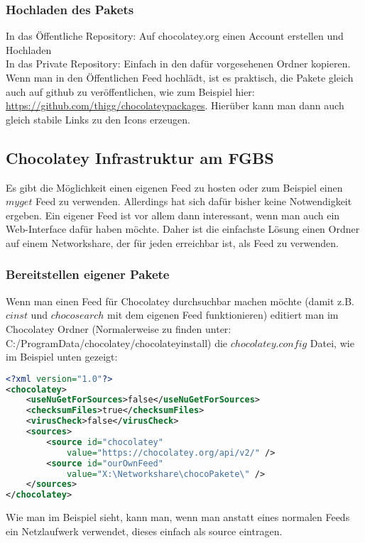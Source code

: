 \documentclass[10pt,a4paper]{article}
\begin{document}
\subsubsection{Hochladen des Pakets}
In das Öffentliche Repository: Auf chocolatey.org einen Account erstellen und Hochladen\\
In das Private Repository: Einfach in den dafür vorgesehenen Ordner kopieren.\\
Wenn man in den Öffentlichen Feed hochlädt, ist es praktisch, die Pakete gleich auch auf github zu veröffentlichen, wie zum Beispiel hier: \url{https://github.com/thigg/chocolateypackages}. Hierüber kann man dann auch gleich stabile Links zu den Icons erzeugen.



\subsection{Chocolatey Infrastruktur am FGBS}
Es gibt die Möglichkeit einen eigenen Feed zu hosten oder zum Beispiel einen $myget$ Feed zu verwenden. Allerdings
hat sich dafür bisher keine Notwendigkeit ergeben. Ein eigener Feed ist vor allem dann interessant, wenn man auch ein Web-Interface dafür haben möchte. Daher ist die einfachste Lösung einen Ordner auf einem Networkshare, der für jeden erreichbar ist, als Feed zu verwenden.

\subsubsection{Bereitstellen eigener Pakete}
Wenn man einen Feed für Chocolatey durchsuchbar machen möchte
(damit z.B. $cinst$ und $choco search$ mit dem eigenen Feed funktionieren)
 editiert man im Chocolatey Ordner 
 (Normalerweise zu finden unter: C:/ProgramData/chocolatey/chocolateyinstall) die $chocolatey.config$ Datei, wie im Beispiel unten gezeigt:
\begin{lstlisting}[language=XML]
<?xml version="1.0"?>
<chocolatey>
    <useNuGetForSources>false</useNuGetForSources>
    <checksumFiles>true</checksumFiles>
    <virusCheck>false</virusCheck>
    <sources>
        <source id="chocolatey" 
            value="https://chocolatey.org/api/v2/" />
        <source id="ourOwnFeed" 
            value="X:\Networkshare\chocoPakete\" />
    </sources>
</chocolatey>

\end{lstlisting}
Wie man im Beispiel sieht, kann man, wenn man anstatt eines normalen Feeds ein Netzlaufwerk verwendet, dieses einfach als source eintragen.
\end{document}

